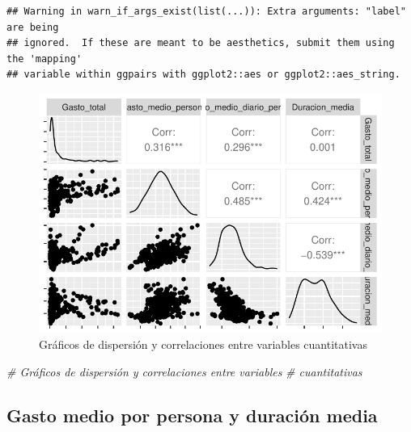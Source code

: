 \documentclass[data,article,submit,moreauthors,pdftex]{Definitions/mdpi}
\newenvironment{Shaded}{\begin{snugshade}}{\end{snugshade}}
\newcommand{\CommentTok}[1]{\textcolor[rgb]{0.56,0.35,0.01}{\textit{#1}}}
\begin{document}
\begin{verbatim}
## Warning in warn_if_args_exist(list(...)): Extra arguments: "label" are being
## ignored.  If these are meant to be aesthetics, submit them using the 'mapping'
## variable within ggpairs with ggplot2::aes or ggplot2::aes_string.
\end{verbatim}

\begin{figure}
\centering
\includegraphics{ProyectoAED2024_Rmd_files/figure-latex/unnamed-chunk-27-1.pdf}
\caption{Gráficos de dispersión y correlaciones entre variables
cuantitativas}
\end{figure}

\begin{Shaded}
\begin{Highlighting}[]
\CommentTok{\# Gráficos de dispersión y correlaciones entre variables}
\CommentTok{\# cuantitativas}
\end{Highlighting}
\end{Shaded}

\subsection{Gasto medio por persona y duración
media}\label{gasto-medio-por-persona-y-duraciuxf3n-media}
\end{document}
